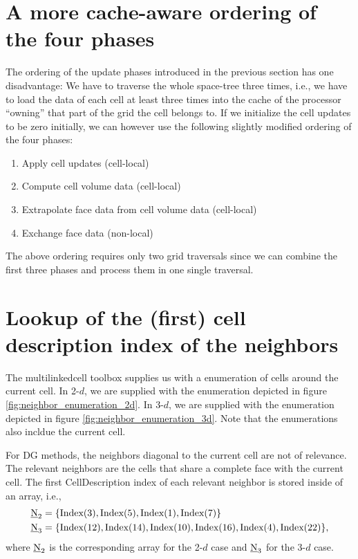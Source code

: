 \documentclass{scrreprt}
\begin{document}
\section{A more cache-aware ordering of the four phases}
The ordering of the update phases introduced in the previous
section has one disadvantage:
We have to traverse the whole space-tree three times, i.e.,
we have to load the data of each cell at least three times
into the cache of the processor ``owning'' that part
of the grid the cell belongs to.
If we initialize the cell updates to be zero initially,
we can however use the following slightly modified ordering of the four phases:
\begin{enumerate}
  \item Apply cell updates (cell-local)
  \item Compute cell volume data (cell-local)
  \item Extrapolate face data from cell volume data (cell-local)
  \item Exchange face data (non-local)
\end{enumerate}
The above ordering requires only two grid traversals since
we can combine the first three phases and process them in one single traversal.

\section{Lookup of the (first) cell description index of the neighbors}
The \rm{multilinkedcell} toolbox supplies us with a
enumeration of cells around the current cell.
In 2-$d$, we are supplied with the enumeration depicted in
figure \ref{fig:neighbor_enumeration_2d}.
In 3-$d$, we are supplied with the enumeration depicted in
figure \ref{fig:neighbor_enumeration_3d}. Note that
the enumerations also incldue the current cell.

For DG methods, the neighbors diagonal to the current cell are not of relevance.
The relevant neighbors are the cells that share a complete face with
the current cell. 
The first \rm{CellDescription} index of each relevant neighbor is stored
inside of an array, i.e.,
\begin{align}
\underline{\mathrm{N}}_{2} &= \{ \textup{Index(3)},
\textup{Index(5)},
\textup{Index(1)},
\textup{Index(7)} \} \\
\underline{\mathrm{N}}_{3} &= \{ \textup{Index(12)},
\textup{Index(14)},
\textup{Index(10)},
\textup{Index(16)},
\textup{Index(4)},
\textup{Index(22)}
\},
\end{align}
where $\underline{\mathrm{N}}_2$ is the corresponding array for the 2-$d$ case
and $\underline{\mathrm{N}}_3$ for the 3-$d$ case.
\end{document}
